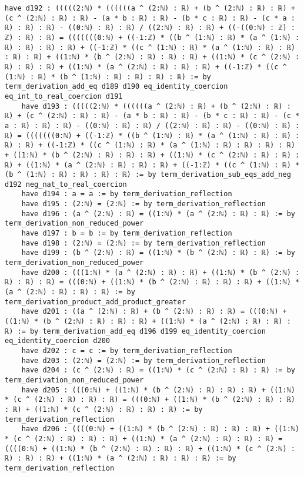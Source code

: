 \documentclass{article}
\begin{document}
\begin{tcolorbox}[colback=white!10, width=\linewidth]
\begin{lstlisting}[language=Lean4]
    have d192 : (((((2:ℕ) * ((((((a ^ (2:ℕ) : ℝ) + (b ^ (2:ℕ) : ℝ) : ℝ) + (c ^ (2:ℕ) : ℝ) : ℝ) - (a * b : ℝ) : ℝ) - (b * c : ℝ) : ℝ) - (c * a : ℝ) : ℝ) : ℝ) - ((0:ℕ) : ℝ) : ℝ) / ((2:ℕ) : ℝ) : ℝ) + ((-((0:ℕ) : ℤ) : ℤ) : ℝ) : ℝ) = (((((((0:ℕ) + ((-1:ℤ) * ((b ^ (1:ℕ) : ℝ) * (a ^ (1:ℕ) : ℝ) : ℝ) : ℝ) : ℝ) + ((-1:ℤ) * ((c ^ (1:ℕ) : ℝ) * (a ^ (1:ℕ) : ℝ) : ℝ) : ℝ) : ℝ) + ((1:ℕ) * (b ^ (2:ℕ) : ℝ) : ℝ) : ℝ) + ((1:ℕ) * (c ^ (2:ℕ) : ℝ) : ℝ) : ℝ) + ((1:ℕ) * (a ^ (2:ℕ) : ℝ) : ℝ) : ℝ) + ((-1:ℤ) * ((c ^ (1:ℕ) : ℝ) * (b ^ (1:ℕ) : ℝ) : ℝ) : ℝ) : ℝ) := by term_derivation_add_eq d189 d190 eq_identity_coercion eq_int_to_real_coercion d191
    have d193 : (((((2:ℕ) * ((((((a ^ (2:ℕ) : ℝ) + (b ^ (2:ℕ) : ℝ) : ℝ) + (c ^ (2:ℕ) : ℝ) : ℝ) - (a * b : ℝ) : ℝ) - (b * c : ℝ) : ℝ) - (c * a : ℝ) : ℝ) : ℝ) - ((0:ℕ) : ℝ) : ℝ) / ((2:ℕ) : ℝ) : ℝ) - ((0:ℕ) : ℝ) : ℝ) = (((((((0:ℕ) + ((-1:ℤ) * ((b ^ (1:ℕ) : ℝ) * (a ^ (1:ℕ) : ℝ) : ℝ) : ℝ) : ℝ) + ((-1:ℤ) * ((c ^ (1:ℕ) : ℝ) * (a ^ (1:ℕ) : ℝ) : ℝ) : ℝ) : ℝ) + ((1:ℕ) * (b ^ (2:ℕ) : ℝ) : ℝ) : ℝ) + ((1:ℕ) * (c ^ (2:ℕ) : ℝ) : ℝ) : ℝ) + ((1:ℕ) * (a ^ (2:ℕ) : ℝ) : ℝ) : ℝ) + ((-1:ℤ) * ((c ^ (1:ℕ) : ℝ) * (b ^ (1:ℕ) : ℝ) : ℝ) : ℝ) : ℝ) := by term_derivation_sub_eqs_add_neg d192 neg_nat_to_real_coercion
    have d194 : a = a := by term_derivation_reflection
    have d195 : (2:ℕ) = (2:ℕ) := by term_derivation_reflection
    have d196 : (a ^ (2:ℕ) : ℝ) = ((1:ℕ) * (a ^ (2:ℕ) : ℝ) : ℝ) := by term_derivation_non_reduced_power
    have d197 : b = b := by term_derivation_reflection
    have d198 : (2:ℕ) = (2:ℕ) := by term_derivation_reflection
    have d199 : (b ^ (2:ℕ) : ℝ) = ((1:ℕ) * (b ^ (2:ℕ) : ℝ) : ℝ) := by term_derivation_non_reduced_power
    have d200 : (((1:ℕ) * (a ^ (2:ℕ) : ℝ) : ℝ) + ((1:ℕ) * (b ^ (2:ℕ) : ℝ) : ℝ) : ℝ) = (((0:ℕ) + ((1:ℕ) * (b ^ (2:ℕ) : ℝ) : ℝ) : ℝ) + ((1:ℕ) * (a ^ (2:ℕ) : ℝ) : ℝ) : ℝ) := by term_derivation_product_add_product_greater
    have d201 : ((a ^ (2:ℕ) : ℝ) + (b ^ (2:ℕ) : ℝ) : ℝ) = (((0:ℕ) + ((1:ℕ) * (b ^ (2:ℕ) : ℝ) : ℝ) : ℝ) + ((1:ℕ) * (a ^ (2:ℕ) : ℝ) : ℝ) : ℝ) := by term_derivation_add_eq d196 d199 eq_identity_coercion eq_identity_coercion d200
    have d202 : c = c := by term_derivation_reflection
    have d203 : (2:ℕ) = (2:ℕ) := by term_derivation_reflection
    have d204 : (c ^ (2:ℕ) : ℝ) = ((1:ℕ) * (c ^ (2:ℕ) : ℝ) : ℝ) := by term_derivation_non_reduced_power
    have d205 : (((0:ℕ) + ((1:ℕ) * (b ^ (2:ℕ) : ℝ) : ℝ) : ℝ) + ((1:ℕ) * (c ^ (2:ℕ) : ℝ) : ℝ) : ℝ) = (((0:ℕ) + ((1:ℕ) * (b ^ (2:ℕ) : ℝ) : ℝ) : ℝ) + ((1:ℕ) * (c ^ (2:ℕ) : ℝ) : ℝ) : ℝ) := by term_derivation_reflection
    have d206 : ((((0:ℕ) + ((1:ℕ) * (b ^ (2:ℕ) : ℝ) : ℝ) : ℝ) + ((1:ℕ) * (c ^ (2:ℕ) : ℝ) : ℝ) : ℝ) + ((1:ℕ) * (a ^ (2:ℕ) : ℝ) : ℝ) : ℝ) = ((((0:ℕ) + ((1:ℕ) * (b ^ (2:ℕ) : ℝ) : ℝ) : ℝ) + ((1:ℕ) * (c ^ (2:ℕ) : ℝ) : ℝ) : ℝ) + ((1:ℕ) * (a ^ (2:ℕ) : ℝ) : ℝ) : ℝ) := by term_derivation_reflection

\end{lstlisting}
\end{tcolorbox}
\end{document}
